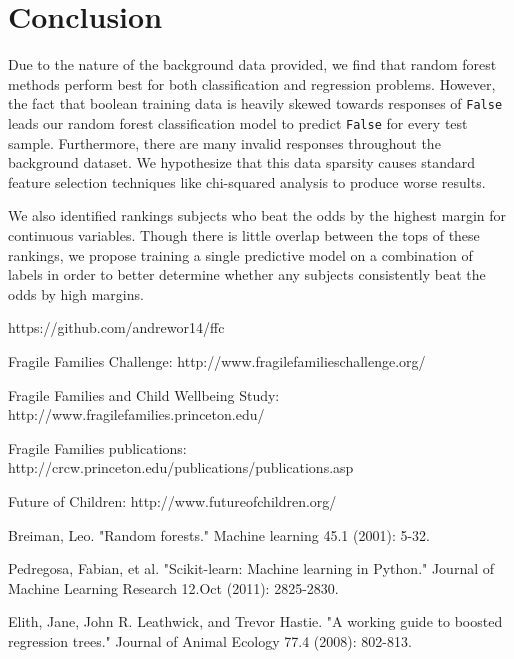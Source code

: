 \documentclass{article} %
\begin{document}
\section{Conclusion}
\label{sec:conclusion}

Due to the nature of the background data provided, we find that random forest methods perform best for both classification and regression problems. However, the fact that boolean training data is heavily skewed towards responses of \texttt{False} leads our random forest classification model to predict \texttt{False} for every test sample. Furthermore, there are many invalid responses throughout the background dataset. We hypothesize that this data sparsity causes standard feature selection techniques like chi-squared analysis to produce worse results.

We also identified rankings subjects who beat the odds by the highest margin for continuous variables. Though there is little overlap between the tops of these rankings, we propose training a single predictive model on a combination of labels in order to better determine whether any subjects consistently beat the odds by high margins.

\begin{thebibliography}{}

https://github.com/andrewor14/ffc

Fragile Families Challenge: http://www.fragilefamilieschallenge.org/

Fragile Families and Child Wellbeing Study: http://www.fragilefamilies.princeton.edu/

Fragile Families publications: http://crcw.princeton.edu/publications/publications.asp

Future of Children: http://www.futureofchildren.org/

Breiman, Leo. "Random forests." Machine learning 45.1 (2001): 5-32.

Pedregosa, Fabian, et al. "Scikit-learn: Machine learning in Python." Journal of Machine Learning Research 12.Oct (2011): 2825-2830.

Elith, Jane, John R. Leathwick, and Trevor Hastie. "A working guide to boosted regression trees." Journal of Animal Ecology 77.4 (2008): 802-813.
 
\end{thebibliography}
\end{document}
